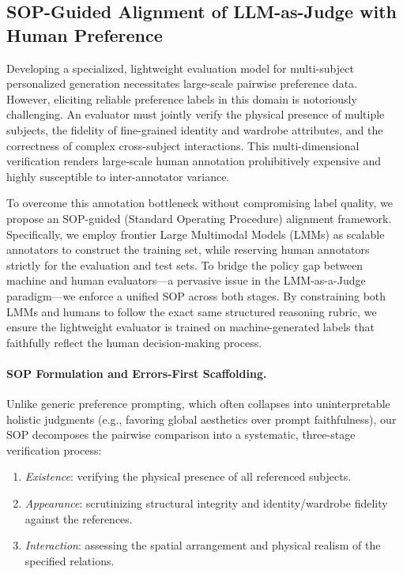 \subsection{SOP-Guided Alignment of LLM-as-Judge with Human Preference}
\label{sec:sop_alignment}

Developing a specialized, lightweight evaluation model for multi-subject personalized generation necessitates large-scale pairwise preference data. However, eliciting reliable preference labels in this domain is notoriously challenging. An evaluator must jointly verify the physical presence of multiple subjects, the fidelity of fine-grained identity and wardrobe attributes, and the correctness of complex cross-subject interactions. This multi-dimensional verification renders large-scale human annotation prohibitively expensive and highly susceptible to inter-annotator variance. 

To overcome this annotation bottleneck without compromising label quality, we propose an SOP-guided (Standard Operating Procedure) alignment framework. Specifically, we employ frontier Large Multimodal Models (LMMs) as scalable annotators to construct the training set, while reserving human annotators strictly for the evaluation and test sets. To bridge the policy gap between machine and human evaluators---a pervasive issue in the LMM-as-a-Judge paradigm---we enforce a unified SOP across both stages. By constraining both LMMs and humans to follow the exact same structured reasoning rubric, we ensure the lightweight evaluator is trained on machine-generated labels that faithfully reflect the human decision-making process.

\paragraph{SOP Formulation and Errors-First Scaffolding.}
Unlike generic preference prompting, which often collapses into uninterpretable holistic judgments (e.g., favoring global aesthetics over prompt faithfulness), our SOP decomposes the pairwise comparison into a systematic, three-stage verification process: 
\begin{enumerate}
    \item \emph{Existence}: verifying the physical presence of all referenced subjects.
    \item \emph{Appearance}: scrutinizing structural integrity and identity/wardrobe fidelity against the references.
    \item \emph{Interaction}: assessing the spatial arrangement and physical realism of the specified relations.
\end{enumerate}

